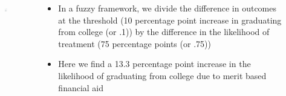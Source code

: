\documentclass{beamer}
\begin{document}
\begin{frame}
\begin{columns}
	\begin{column}{0.48\textwidth}
  		  \begin{figure}[h]
   			 \includegraphics[width = 2.15in]{turner1e_fig_03_04.png}
   		 \end{figure}
	\end{column}
	\begin{column}{0.48\textwidth}
		\begin{itemize}[<+->]
			\item In a fuzzy framework, we divide the difference in outcomes at the threshold (10 percentage point increase in graduating from college (or .1)) by the difference in the likelihood of treatment (75 percentage points (or .75)) \medskip
			\item Here we find a 13.3 percentage point increase in the likelihood of graduating from college due to merit based financial aid
		\end{itemize}
		
	\end{column}
\end{columns}

\end{frame}
\end{document}
